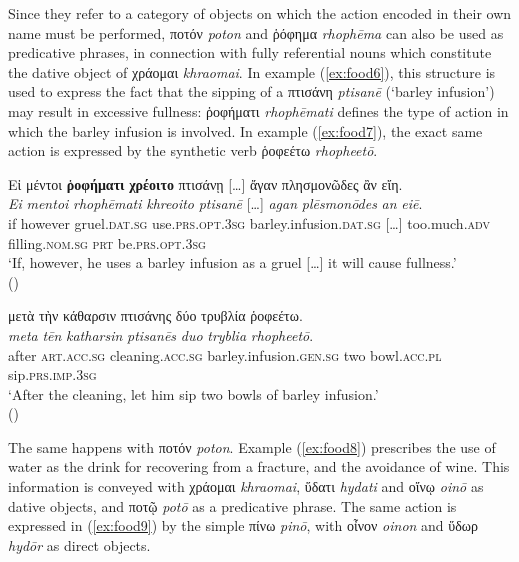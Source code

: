 \documentclass[output=paper,colorlinks,citecolor=brown]{langscibook}
\begin{document}
Since they refer to a category of objects on which the action encoded in their own name must be performed, ποτόν \textit{poton} and ῥόφημα \textit{rhophēma} can also be used as predicative phrases, in connection with fully referential nouns which constitute the dative object of χράομαι \textit{khraomai}. In example (\ref{ex:food6}), this structure is used to express the fact that the sipping of a πτισάνη \textit{ptisanē} (‘barley infusion') may result in excessive fullness: ῥοφήματι \textit{rhophēmati} defines the type of action in which the barley infusion is involved. In example (\ref{ex:food7}), the exact same action is expressed by the synthetic verb ῥοφεέτω \textit{rhopheetō}. 

\begin{exe}
\ex\label{ex:food6}
\glll Εἰ μέντοι \textbf{ῥοφήματι} \textbf{χρέοιτο} πτισάνῃ […] ἄγαν πλησμονῶδες ἂν εἴη. \\ 
\textit{Ei} \textit{mentoi} \textit{rhophēmati} \textit{khreoito} \textit{ptisanē} […] \textit{agan} \textit{plēsmonōdes} \textit{an} \textit{eiē}.\\
if however gruel.\textsc{dat.sg} use.\textsc{prs.opt.3sg} barley.infusion.\textsc{dat.sg} […] too.much.\textsc{adv} filling.\textsc{nom.sg} \textsc{prt} be.\textsc{prs.opt.3sg} \\
\glt ‘If, however, he uses a barley infusion as a gruel […] it will cause fullness.' \\
\hspace*{\fill}()
\end{exe}

\begin{exe}
\ex\label{ex:food7}
\glll μετὰ τὴν κάθαρσιν πτισάνης δύο τρυβλία ῥοφεέτω.\\ 
\textit{meta} \textit{tēn} \textit{katharsin} \textit{ptisanēs} \textit{duo} \textit{tryblia} \textit{rhopheetō}.\\
after \textsc{art.acc.sg} cleaning.\textsc{acc.sg} barley.infusion.\textsc{gen.sg} two bowl.\textsc{acc.pl} sip.\textsc{prs.imp.3sg} \\
\glt ‘After the cleaning, let him sip two bowls of barley infusion.' \\
\hspace*{\fill}()
\end{exe}

The same happens with ποτόν \textit{poton}. Example (\ref{ex:food8}) prescribes the use of water as the drink for recovering from a fracture, and the avoidance of wine. This information is conveyed with χράομαι \textit{khraomai}, ὕδατι \textit{hydati} and οἴνῳ \textit{oinō} as dative objects, and ποτῷ \textit{potō} as a predicative phrase. The same action is expressed in (\ref{ex:food9}) by the simple πίνω \textit{pinō}, with οἶνον \textit{oinon} and ὕδωρ \textit{hydōr} as direct objects.
\end{document}
